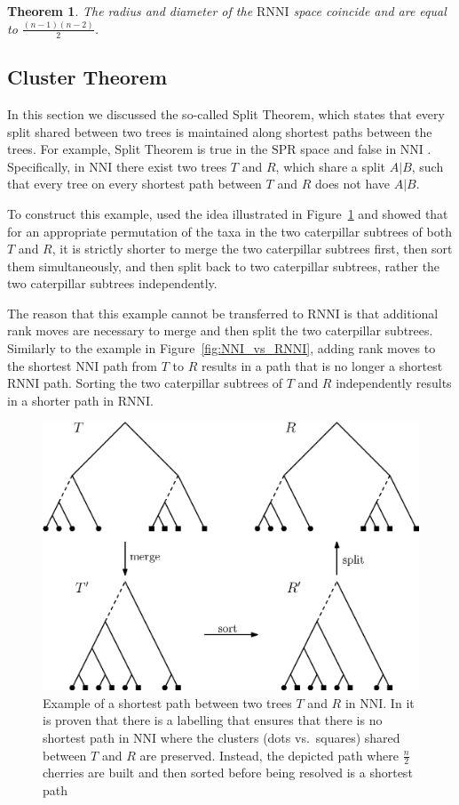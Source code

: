 \documentclass{amsart}
\newcommand{\nni}{\mathrm{NNI}}
\newcommand{\rnni}{\mathrm{RNNI}}
\newcommand{\spr}{\mathrm{SPR}}
\newtheorem{theorem}[definition]{Theorem}
\begin{document}
\begin{theorem}
The radius and diameter of the $\rnni$ space coincide and are equal to $\frac{(n-1)(n-2)}{2}$.
\label{thm:radius}
\end{theorem}


\subsection{Cluster Theorem}
\label{section:cluster_theorem}

In this section we discussed the so-called Split Theorem, which states that every split shared between two trees is maintained along shortest paths between the trees.
For example, Split Theorem is true in the $\spr$ space and false in $\nni$ \autocite{Li1996-zw}.
Specifically, in $\nni$ there exist two trees $T$ and $R$, which share a split $A | B$, such that every tree on every shortest path between $T$ and $R$ does not have $A | B$.

To construct this example, \textcite{Li1996-zw} used the idea illustrated in Figure~\ref{fig:NNI_NP_proof} and showed that for an appropriate permutation of the taxa in the two caterpillar subtrees of both $T$ and $R$, it is strictly shorter to merge the two caterpillar subtrees first, then sort them simultaneously, and then split back to two caterpillar subtrees, rather the two caterpillar subtrees independently.

The reason that this example cannot be transferred to $\rnni$ is that additional rank moves are necessary to merge and then split the two caterpillar subtrees.
Similarly to the example in Figure~\ref{fig:NNI_vs_RNNI}, adding rank moves to the shortest $\nni$ path from $T$ to $R$ results in a path that is no longer a shortest $\rnni$ path.
Sorting the two caterpillar subtrees of $T$ and $R$ independently results in a shorter path in $\rnni$.

\begin{figure}[H]
\centering
\includegraphics[width=.8\textwidth]{NNI_NP_proof}
\vspace{12pt}
\caption{Example of a shortest path between two trees $T$ and $R$ in $\nni$.
In \autocite{Li1996-zw} it is proven that there is a labelling that ensures that there is no shortest path in $\nni$ where the clusters (dots vs.\ squares) shared between $T$ and $R$ are preserved.
Instead, the depicted path where $\frac{n}{2}$ cherries are built and then sorted before being resolved is a shortest path}
\label{fig:NNI_NP_proof}
\end{figure}
\end{document}
